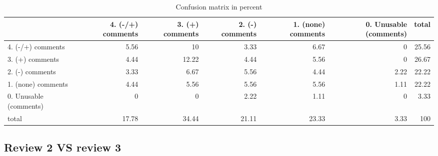 \documentclass{article}
\begin{document}
\begin{table}[H]

\centering

\begin{tabular}{lrrrrrr}
\hline
                        &   4. (-/+) comments &   3. (+) comments &   2. (-) comments &   1. (none) comments &   0. Unusable (comments) &   total \\
\hline
 4. (-/+) comments      &                5.56 &             10    &              3.33 &                 6.67 &                     0    &   25.56 \\
 3. (+) comments        &                4.44 &             12.22 &              4.44 &                 5.56 &                     0    &   26.67 \\
 2. (-) comments        &                3.33 &              6.67 &              5.56 &                 4.44 &                     2.22 &   22.22 \\
 1. (none) comments     &                4.44 &              5.56 &              5.56 &                 5.56 &                     1.11 &   22.22 \\
 0. Unusable (comments) &                0    &              0    &              2.22 &                 1.11 &                     0    &    3.33 \\
 total                  &               17.78 &             34.44 &             21.11 &                23.33 &                     3.33 &  100    \\
\hline
\end{tabular}\caption{Confusion matrix in percent}

\end{table}



\subsection{Review 2 VS review 3} 
\end{document}
